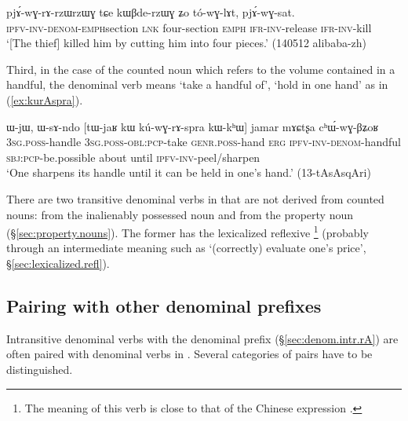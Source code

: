 \begin{exe}
\ex \label{ex:pjArwGrzWrzWG}
 \gll  pjɤ́-wɣ-rɤ-rzɯ\redp{}rzɯɣ tɕe kɯβde-rzɯɣ ʑo tó-wɣ-lɤt, pjɤ́-wɣ-sat. \\
 \textsc{ipfv}-\textsc{inv}-\textsc{denom}-\textsc{emph}\redp{}section \textsc{lnk} four-section \textsc{emph} \textsc{ifr}-\textsc{inv}-release \textsc{ifr}-\textsc{inv}-kill \\
 \glt `[The thief] killed him by cutting him into four pieces.'  (140512 alibaba-zh) 
\end{exe}

Third, in the case of the counted noun  which refers to the volume contained in a handful, the denominal verb means `take a handful of', `hold in one hand' as in (\ref{ex:kurAspra}).

\begin{exe}
\ex \label{ex:kurAspra}
 \gll ɯ-jɯ, ɯ-sɤ-ndo [tɯ-jaʁ kɯ kú-wɣ-rɤ-spra kɯ-kʰɯ] jamar mɤɕtʂa cʰɯ́-wɣ-βʑoʁ \\
 \textsc{3sg}.\textsc{poss}-handle \textsc{3sg}.\textsc{poss}-\textsc{obl}:\textsc{pcp}-take \textsc{genr}.\textsc{poss}-hand \textsc{erg} \textsc{ipfv}-\textsc{inv}-\textsc{denom}-handful \textsc{sbj}:\textsc{pcp}-be.possible about until \textsc{ipfv}-\textsc{inv}-peel/sharpen \\
\glt `One sharpens its handle until it can be held in one's hand.' (13-tAsAsqAri)
\end{exe}


There are two transitive denominal verbs in  that are not derived from counted nouns:  from the inalienably possessed noun  and  from the property noun  (§\ref{sec:property.nouns}).  The former has the lexicalized reflexive \footnote{The meaning of this verb is close to that of the Chinese expression .} (probably through an intermediate meaning such as `(correctly) evaluate one's price', §\ref{sec:lexicalized.refl}).


\subsection{Pairing with other denominal prefixes}  \label{sec:denom.rA.pairing}
Intransitive denominal verbs with the  denominal prefix (§\ref{sec:denom.intr.rA}) are often paired with denominal verbs in .  Several categories of  pairs have to be distinguished.

